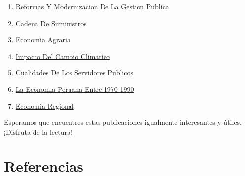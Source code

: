 \documentclass[
  jou,
  floatsintext,
  longtable,
  a4paper,
  nolmodern,
  notxfonts,
  notimes,
  colorlinks=true,linkcolor=blue,citecolor=blue,urlcolor=blue]{apa7}
\begin{document}
\begin{enumerate}
{  Publica Y Administracion Publica}
\item
  \href{https://achalmaedison.netlify.app/blog/posts/2021-10-01-reformas-y-modernizacion-de-la-gestion-publica/index.pdf}{}
  \href{https://achalmaedison.netlify.app/blog/posts/2021-10-01-reformas-y-modernizacion-de-la-gestion-publica}{Reformas
  Y Modernizacion De La Gestion Publica}
\item
  \href{https://achalmaedison.netlify.app/blog/posts/2022-01-23-cadena\%20de\%20suministros/index.pdf}{}
  \href{https://achalmaedison.netlify.app/blog/posts/2022-01-23-cadena\%20de\%20suministros}{Cadena
  De Suministros}
\item
  \href{https://achalmaedison.netlify.app/blog/posts/2022-04-22-economia-agraria/index.pdf}{}
  \href{https://achalmaedison.netlify.app/blog/posts/2022-04-22-economia-agraria}{Economia
  Agraria}
\item
  \href{https://achalmaedison.netlify.app/blog/posts/2022-06-02-impacto-del-cambio-climatico/index.pdf}{}
  \href{https://achalmaedison.netlify.app/blog/posts/2022-06-02-impacto-del-cambio-climatico}{Impacto
  Del Cambio Climatico}
\item
  \href{https://achalmaedison.netlify.app/blog/posts/2023-05-11-cualidades-de-los-servidores-publicos/index.pdf}{}
  \href{https://achalmaedison.netlify.app/blog/posts/2023-05-11-cualidades-de-los-servidores-publicos}{Cualidades
  De Los Servidores Publicos}
\item
  \href{https://achalmaedison.netlify.app/blog/posts/2023-05-12-la-economia-peruana-entre-1970-1990/index.pdf}{}
  \href{https://achalmaedison.netlify.app/blog/posts/2023-05-12-la-economia-peruana-entre-1970-1990}{La
  Economia Peruana Entre 1970 1990}
\item
  \href{https://achalmaedison.netlify.app/blog/posts/2023-05-16-economia-regional/index.pdf}{}
  \href{https://achalmaedison.netlify.app/blog/posts/2023-05-16-economia-regional}{Economia
  Regional}
\end{enumerate}

Esperamos que encuentres estas publicaciones igualmente interesantes y
útiles. ¡Disfruta de la lectura!

\section{Referencias}\label{referencias}
\end{document}
